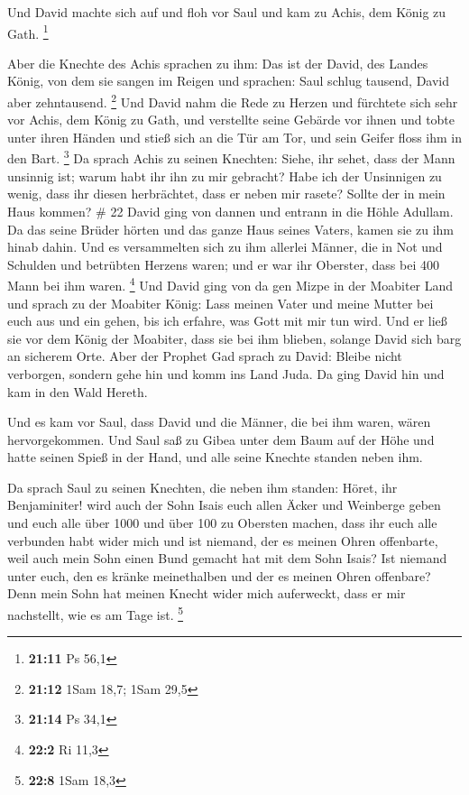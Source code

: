  Und David machte sich auf und floh vor Saul und kam zu
Achis, dem König zu Gath. \footnote{\textbf{21:11} Ps 56,1}

 Aber die Knechte des Achis sprachen zu ihm: Das ist der
David, des Landes König, von dem sie sangen im Reigen und sprachen: Saul
schlug tausend, David aber zehntausend. \footnote{\textbf{21:12} 1Sam
  18,7; 1Sam 29,5}  Und David nahm die Rede zu Herzen und
fürchtete sich sehr vor Achis, dem König zu Gath,  und
verstellte seine Gebärde vor ihnen und tobte unter ihren Händen und
stieß sich an die Tür am Tor, und sein Geifer floss ihm in den Bart.
\footnote{\textbf{21:14} Ps 34,1}  Da sprach Achis zu
seinen Knechten: Siehe, ihr sehet, dass der Mann unsinnig ist; warum
habt ihr ihn zu mir gebracht?  Habe ich der Unsinnigen zu
wenig, dass ihr diesen herbrächtet, dass er neben mir rasete? Sollte der
in mein Haus kommen? \# 22  David ging von dannen und
entrann in die Höhle Adullam. Da das seine Brüder hörten und das ganze
Haus seines Vaters, kamen sie zu ihm hinab dahin.  Und es
versammelten sich zu ihm allerlei Männer, die in Not und Schulden und
betrübten Herzens waren; und er war ihr Oberster, dass bei 400 Mann bei
ihm waren. \footnote{\textbf{22:2} Ri 11,3}  Und David
ging von da gen Mizpe in der Moabiter Land und sprach zu der Moabiter
König: Lass meinen Vater und meine Mutter bei euch aus und ein gehen,
bis ich erfahre, was Gott mit mir tun wird.  Und er ließ
sie vor dem König der Moabiter, dass sie bei ihm blieben, solange David
sich barg an sicherem Orte.  Aber der Prophet Gad sprach
zu David: Bleibe nicht verborgen, sondern gehe hin und komm ins Land
Juda. Da ging David hin und kam in den Wald Hereth.

 Und es kam vor Saul, dass David und die Männer, die bei
ihm waren, wären hervorgekommen. Und Saul saß zu Gibea unter dem Baum
auf der Höhe und hatte seinen Spieß in der Hand, und alle seine Knechte
standen neben ihm.

 Da sprach Saul zu seinen Knechten, die neben ihm standen:
Höret, ihr Benjaminiter! wird auch der Sohn Isais euch allen Äcker und
Weinberge geben und euch alle über 1000 und über 100 zu Obersten machen,
 dass ihr euch alle verbunden habt wider mich und ist
niemand, der es meinen Ohren offenbarte, weil auch mein Sohn einen Bund
gemacht hat mit dem Sohn Isais? Ist niemand unter euch, den es kränke
meinethalben und der es meinen Ohren offenbare? Denn mein Sohn hat
meinen Knecht wider mich auferweckt, dass er mir nachstellt, wie es am
Tage ist. \footnote{\textbf{22:8} 1Sam 18,3}

